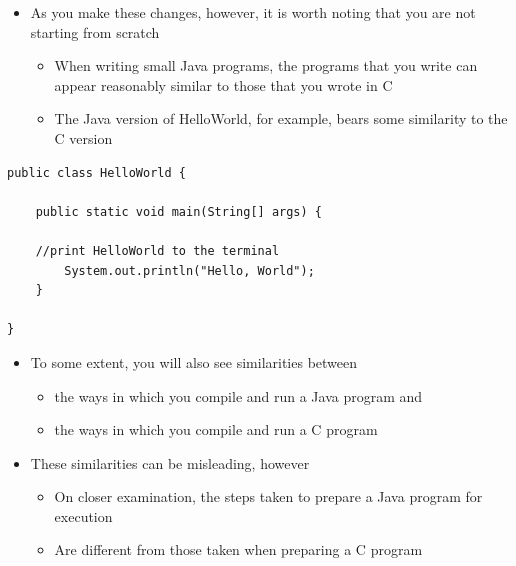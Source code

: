 \documentclass{beamer}
\begin{document}
\begin{frame}\begin{itemize}

\item As you make these changes, however, it is worth noting that you are
not starting from scratch

\begin{itemize}
\item When writing small Java programs, the programs that you write can appear reasonably
similar to those that you wrote in C
\item The Java version of HelloWorld, for example, bears some similarity
to the C version

\end{itemize}
\end{itemize}\end{frame}

\begin{frame}[fragile]
\begin{block}{}
\begin{lstlisting}
public class HelloWorld {

    public static void main(String[] args) {
        
	//print HelloWorld to the terminal
        System.out.println("Hello, World");
    }

}
\end{lstlisting}
\end{block}
\end{frame}

\begin{frame}\begin{itemize}

\item To some extent, you will also see similarities between 

\begin{itemize}
\item the ways in which you compile and run a Java program and
\item the ways in which you compile and run a C program
\end{itemize}
\item These similarities can be misleading, however

\begin{itemize}
\item On closer examination, the steps taken to prepare a Java program for
execution
\item Are different from those taken when preparing a C program
\end{itemize}
\end{itemize}\end{frame}
\end{document}
